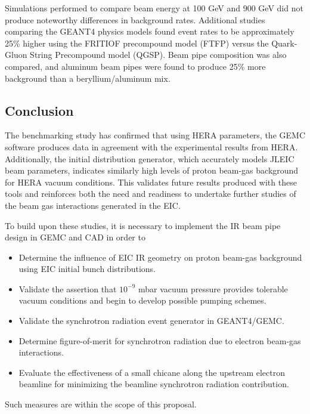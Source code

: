 Simulations  performed to compare beam energy at 100 GeV and 900 GeV did not produce noteworthy differences in background rates.  Additional studies comparing the GEANT4 physics models found event rates to be approximately 25\% higher using the FRITIOF precompound model (FTFP) versus the Quark-Gluon String Precompound model (QGSP).  Beam pipe composition was also compared, and aluminum beam pipes were found to produce 25\% more background than a beryllium/aluminum mix.




\subsection{Conclusion}
The benchmarking study has confirmed that using HERA parameters, the GEMC software produces data in agreement with the experimental results from HERA.  Additionally, the initial distribution generator, which accurately models JLEIC beam parameters, indicates similarly high levels of proton beam-gas background for HERA vacuum conditions.  This validates future results produced with these tools and reinforces both the need and readiness to undertake further studies of the beam gas interactions generated in the EIC.  

To build upon these studies, it is necessary to implement the IR beam pipe design in GEMC and CAD in order to 

\begin{itemize}
	\item Determine the influence of EIC IR geometry on proton beam-gas background using EIC initial  bunch distributions.
	\item Validate the assertion that $10^{-9}$ mbar vacuum pressure provides tolerable vacuum conditions and begin to develop possible pumping schemes.
	\item Validate the synchrotron radiation event generator in GEANT4/GEMC.
	\item Determine figure-of-merit for synchrotron radiation due to electron beam-gas interactions.
	\item Evaluate the effectiveness of a small chicane along the upstream electron beamline for minimizing the beamline synchrotron radiation contribution.
\end{itemize}

Such measures are within the scope of this proposal.












